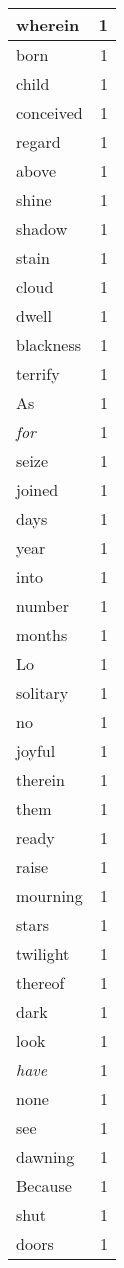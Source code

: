 \begin{center}
\begin{longtable}{l|r}
wherein & 1\\ \hline 
born & 1\\ \hline 
child & 1\\ \hline 
conceived & 1\\ \hline 
regard & 1\\ \hline 
above & 1\\ \hline 
shine & 1\\ \hline 
shadow & 1\\ \hline 
stain & 1\\ \hline 
cloud & 1\\ \hline 
dwell & 1\\ \hline 
blackness & 1\\ \hline 
terrify & 1\\ \hline 
As & 1\\ \hline 
\emph{for} & 1\\ \hline 
seize & 1\\ \hline 
joined & 1\\ \hline 
days & 1\\ \hline 
year & 1\\ \hline 
into & 1\\ \hline 
number & 1\\ \hline 
months & 1\\ \hline 
Lo & 1\\ \hline 
solitary & 1\\ \hline 
no & 1\\ \hline 
joyful & 1\\ \hline 
therein & 1\\ \hline 
them & 1\\ \hline 
ready & 1\\ \hline 
raise & 1\\ \hline 
mourning & 1\\ \hline 
stars & 1\\ \hline 
twilight & 1\\ \hline 
thereof & 1\\ \hline 
dark & 1\\ \hline 
look & 1\\ \hline 
\emph{have} & 1\\ \hline 
none & 1\\ \hline 
see & 1\\ \hline 
dawning & 1\\ \hline 
Because & 1\\ \hline 
shut & 1\\ \hline 
doors & 1\\ \hline 

\end{longtable}
\end{center}

